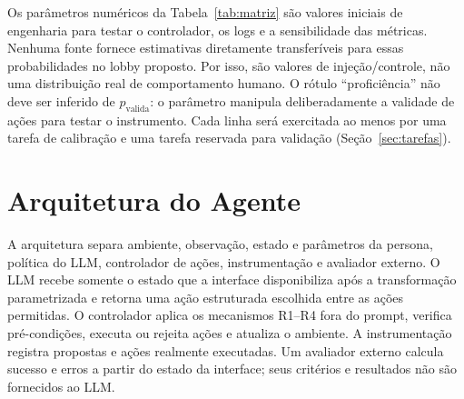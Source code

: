 \documentclass[conference]{IEEEtran}
\begin{document}
Os parâmetros numéricos da Tabela~\ref{tab:matriz} são valores iniciais de engenharia para testar o controlador, os logs e a sensibilidade das métricas. Nenhuma fonte fornece estimativas diretamente transferíveis para essas probabilidades no lobby proposto. Por isso, são valores de injeção/controle, não uma distribuição real de comportamento humano. O rótulo “proficiência” não deve ser inferido de $p_{\mathrm{valida}}$: o parâmetro manipula deliberadamente a validade de ações para testar o instrumento. Cada linha será exercitada ao menos por uma tarefa de calibração e uma tarefa reservada para validação (Seção~\ref{sec:tarefas}).


\section{Arquitetura do Agente}

A arquitetura separa ambiente, observação, estado e parâmetros da persona, política do LLM, controlador de ações, instrumentação e avaliador externo. O LLM recebe somente o estado que a interface disponibiliza após a transformação parametrizada e retorna uma ação estruturada escolhida entre as ações permitidas. O controlador aplica os mecanismos R1--R4 fora do prompt, verifica pré-condições, executa ou rejeita ações e atualiza o ambiente. A instrumentação registra propostas e ações realmente executadas. Um avaliador externo calcula sucesso e erros a partir do estado da interface; seus critérios e resultados não são fornecidos ao LLM.
\end{document}

